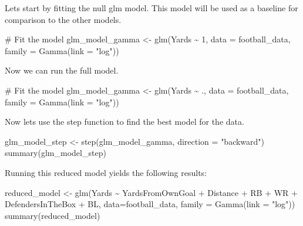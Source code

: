\documentclass[
  super,
  preprint,
  3p]{elsarticle}
\newenvironment{Shaded}{\begin{snugshade}}{\end{snugshade}}
\newcommand{\AttributeTok}[1]{\textcolor[rgb]{0.40,0.45,0.13}{#1}}
\newcommand{\CommentTok}[1]{\textcolor[rgb]{0.37,0.37,0.37}{#1}}
\newcommand{\DecValTok}[1]{\textcolor[rgb]{0.68,0.00,0.00}{#1}}
\newcommand{\FunctionTok}[1]{\textcolor[rgb]{0.28,0.35,0.67}{#1}}
\newcommand{\NormalTok}[1]{\textcolor[rgb]{0.00,0.23,0.31}{#1}}
\newcommand{\OtherTok}[1]{\textcolor[rgb]{0.00,0.23,0.31}{#1}}
\newcommand{\SpecialCharTok}[1]{\textcolor[rgb]{0.37,0.37,0.37}{#1}}
\newcommand{\StringTok}[1]{\textcolor[rgb]{0.13,0.47,0.30}{#1}}
\begin{document}
Lets start by fitting the null glm model. This model will be used as a
baseline for comparison to the other models.

\begin{Shaded}
\begin{Highlighting}[]
\CommentTok{\# Fit the model}
\NormalTok{glm\_model\_gamma }\OtherTok{\textless{}{-}} \FunctionTok{glm}\NormalTok{(Yards }\SpecialCharTok{\textasciitilde{}} \DecValTok{1}\NormalTok{, }\AttributeTok{data =}\NormalTok{ football\_data, }\AttributeTok{family =} \FunctionTok{Gamma}\NormalTok{(}\AttributeTok{link =} \StringTok{"log"}\NormalTok{))}
\end{Highlighting}
\end{Shaded}

Now we can run the full model.

\begin{Shaded}
\begin{Highlighting}[]
\CommentTok{\# Fit the model}
\NormalTok{glm\_model\_gamma }\OtherTok{\textless{}{-}} \FunctionTok{glm}\NormalTok{(Yards }\SpecialCharTok{\textasciitilde{}}\NormalTok{ ., }\AttributeTok{data =}\NormalTok{ football\_data, }\AttributeTok{family =} \FunctionTok{Gamma}\NormalTok{(}\AttributeTok{link =} \StringTok{"log"}\NormalTok{))}
\end{Highlighting}
\end{Shaded}

Now lets use the step function to find the best model for the data.

\begin{Shaded}
\begin{Highlighting}[]
\NormalTok{glm\_model\_step }\OtherTok{\textless{}{-}} \FunctionTok{step}\NormalTok{(glm\_model\_gamma, }\AttributeTok{direction =} \StringTok{"backward"}\NormalTok{)}
\FunctionTok{summary}\NormalTok{(glm\_model\_step)}
\end{Highlighting}
\end{Shaded}

Running this reduced model yields the following results:

\begin{Shaded}
\begin{Highlighting}[]
\NormalTok{reduced\_model }\OtherTok{\textless{}{-}} \FunctionTok{glm}\NormalTok{(Yards }\SpecialCharTok{\textasciitilde{}}\NormalTok{ YardsFromOwnGoal }\SpecialCharTok{+}\NormalTok{ Distance }\SpecialCharTok{+}\NormalTok{ RB }\SpecialCharTok{+}\NormalTok{ WR }\SpecialCharTok{+}\NormalTok{ DefendersInTheBox }\SpecialCharTok{+}\NormalTok{ BL, }\AttributeTok{data=}\NormalTok{football\_data, }\AttributeTok{family =} \FunctionTok{Gamma}\NormalTok{(}\AttributeTok{link =} \StringTok{"log"}\NormalTok{))}
\FunctionTok{summary}\NormalTok{(reduced\_model)}
\end{Highlighting}
\end{Shaded}
\end{document}
